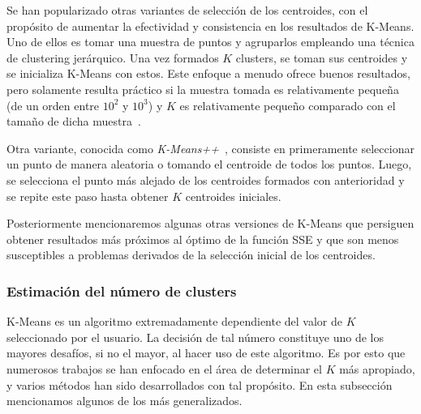 Se han popularizado otras variantes de selección de los centroides, con el propósito de aumentar la efectividad y consistencia en los resultados de K-Means.
Uno de ellos es tomar una muestra de puntos y agruparlos empleando una técnica de clustering jerárquico.
Una vez formados $K$ clusters, se toman sus centroides y se inicializa K-Means con estos.
Este enfoque a menudo ofrece buenos resultados, pero solamente resulta práctico si la muestra tomada es relativamente pequeña (de un orden entre $10^2$ y $10^3$) y $K$ es relativamente pequeño comparado con el tamaño de dicha muestra~\cite{Unknown}.

Otra variante, conocida como \textit{K-Means++}~\cite{Arthur07}, consiste en primeramente seleccionar un punto de manera aleatoria o tomando el centroide de todos los puntos.
Luego, se selecciona el punto más alejado de los centroides formados con anterioridad y se repite este paso hasta obtener $K$ centroides iniciales.

Posteriormente mencionaremos algunas otras versiones de K-Means que persiguen obtener resultados más próximos al óptimo de la función SSE y que son menos susceptibles a problemas derivados de la selección inicial de los centroides.

\subsubsection{Estimación del número de clusters}

K-Means es un algoritmo extremadamente dependiente del valor de $K$ seleccionado por el usuario.
La decisión de tal número constituye uno de los mayores desafíos, si no el mayor, al hacer uso de este algoritmo.
Es por esto que numerosos trabajos se han enfocado en el área de determinar el $K$ más apropiado, y varios métodos han sido desarrollados con tal propósito.
En esta subsección mencionamos algunos de los más generalizados.

